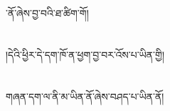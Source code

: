 ་ནོ་ཞེས་བྱ་བའི་ཐ་ཚིག་གོ།\chapter{ }།དེའི་ཕྱིར་དེ་དག་ཁོ་ན་ཕྱག་བྱ་བར་འོས་པ་ཡིན་གྱི།\chapter{ }གཞན་དག་ལ་ནི་མ་ཡིན་ནོ་ཞེས་བཤད་པ་ཡིན་ནོ།\chapt